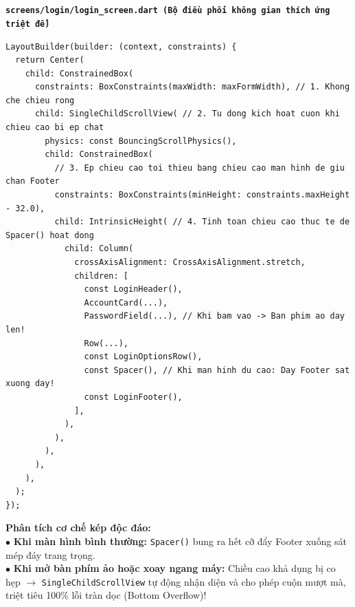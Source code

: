 \documentclass[aspectratio=169, 10pt]{beamer}
\newcommand{\SlideHeader}[2]{%
  \noindent{\textcolor{AccentOrange}{\textbf{\footnotesize #1}}}\\[0.08cm]
  \noindent{\Large \textbf{\textcolor{NavyTitle}{#2}}}\\[0.22cm]
}
\begin{document}
\begin{frame}[fragile]
  \SlideHeader{NHẤN MẠNH GIẢI PHÁP CỦA TÔI}{Bộ 4 Kinh Điển Trị Tràn Dọc Bàn Phím Ảo}

  \textbf{\texttt{screens/login/login\_screen.dart (Bộ điều phối không gian thích ứng triệt để)}}
\begin{lstlisting}
LayoutBuilder(builder: (context, constraints) {
  return Center(
    child: ConstrainedBox(
      constraints: BoxConstraints(maxWidth: maxFormWidth), // 1. Khong che chieu rong
      child: SingleChildScrollView( // 2. Tu dong kich hoat cuon khi chieu cao bi ep chat
        physics: const BouncingScrollPhysics(),
        child: ConstrainedBox(
          // 3. Ep chieu cao toi thieu bang chieu cao man hinh de giu chan Footer
          constraints: BoxConstraints(minHeight: constraints.maxHeight - 32.0),
          child: IntrinsicHeight( // 4. Tinh toan chieu cao thuc te de Spacer() hoat dong
            child: Column(
              crossAxisAlignment: CrossAxisAlignment.stretch,
              children: [
                const LoginHeader(),
                AccountCard(...),
                PasswordField(...), // Khi bam vao -> Ban phim ao day len!
                Row(...),
                const LoginOptionsRow(),
                const Spacer(), // Khi man hinh du cao: Day Footer sat xuong day!
                const LoginFooter(),
              ],
            ),
          ),
        ),
      ),
    ),
  );
});
\end{lstlisting}

  \begin{tcolorbox}[colback=CardBg, colframe=NavyHeader!30, arc=4pt, boxrule=0.8pt, top=3pt, bottom=3pt]
    {\scriptsize \textbf{Phân tích cơ chế kép độc đáo:}\\
    $\bullet$ \textbf{Khi màn hình bình thường:} \texttt{Spacer()} bung ra hết cỡ đẩy Footer xuống sát mép đáy trang trọng.\\
    $\bullet$ \textbf{Khi mở bàn phím ảo hoặc xoay ngang máy:} Chiều cao khả dụng bị co hẹp $\rightarrow$ \texttt{SingleChildScrollView} tự động nhận diện và cho phép cuộn mượt mà, triệt tiêu 100\% lỗi tràn dọc (Bottom Overflow)!}
  \end{tcolorbox}
\end{frame}
\end{document}
